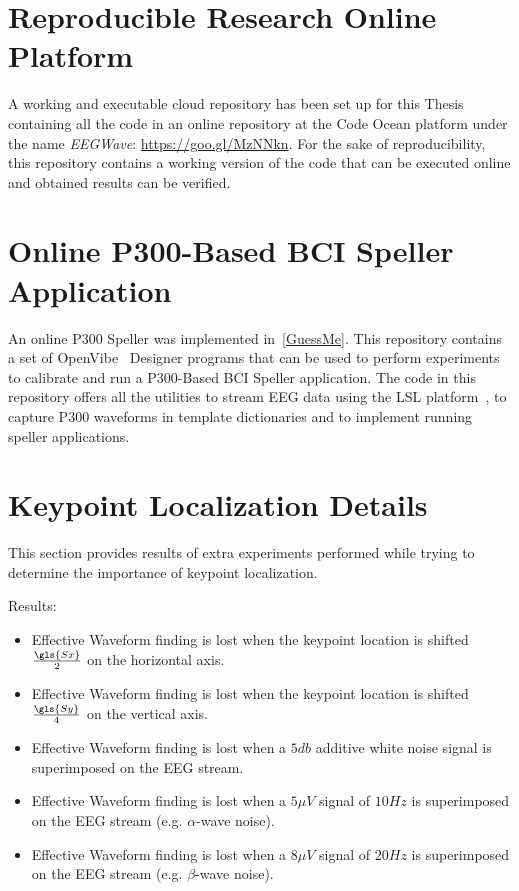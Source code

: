 \section{Reproducible Research Online Platform}

A working and executable cloud repository has been set up for this Thesis containing all the code in an online repository at the Code Ocean platform under the name \textit{EEGWave}: \url{https://goo.gl/MzNNkn}.  For the sake of reproducibility, this repository contains a working version of the code that can be executed online and obtained results can be verified.

\section{Online P300-Based BCI Speller Application}

An online P300 Speller was implemented in~\ref{GuessMe}.  This repository contains a set of OpenVibe~\cite{Renard2010} Designer programs that can be used to perform experiments to calibrate and run a P300-Based BCI Speller application.  The code in this repository offers all the utilities to stream EEG data using the LSL platform~\cite{Labstreaminglayer}, to capture P300 waveforms in template dictionaries and to implement running speller applications.

\section{Keypoint Localization Details}

This section provides results of extra experiments performed while trying to determine the importance of keypoint localization.

Results:

\begin{itemize}
\item Effective Waveform finding is lost when the keypoint location is shifted $\frac{\gls{Sx}}{2}$ on the horizontal axis.
\item Effective Waveform finding is lost when the keypoint location is shifted $\frac{\gls{Sy}}{4}$ on the vertical axis.
\item Effective Waveform finding is lost when a $5 \si{db}$ additive white noise signal is superimposed on the EEG stream. 
\item Effective Waveform finding is lost when a $5 \mu V$ signal of $10 \si{Hz}$ is superimposed on the EEG stream (e.g. $\alpha$-wave noise).
\item Effective Waveform finding is lost when a $8 \mu V$ signal of $20 \si{Hz}$ is superimposed on the EEG stream (e.g. $\beta$-wave noise).  
\end{itemize}

